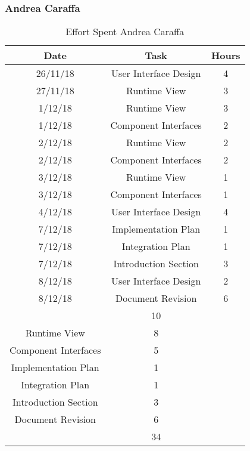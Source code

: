\clearpage
\newpage

\subsubsection{Andrea Caraffa}
\begin{table}[h]
\centering
\begin{tabular}{|c|c|c|}
\hline
\rowcolor[HTML]{FE996B} 
Date & Task & Hours 
\\ \hline
\rowcolor[HTML]{FFFC9E} 
26/11/18  & User Interface Design & 4
\\ \hline
\rowcolor[HTML]{FFFC9E} 
27/11/18 & Runtime View & 3 
\\ \hline
\rowcolor[HTML]{FFFC9E}
1/12/18 & Runtime View & 3
\\ \hline
\rowcolor[HTML]{FFFC9E}
1/12/18 & Component Interfaces & 2
\\ \hline
\rowcolor[HTML]{FFFC9E}
2/12/18 & Runtime View & 2
\\ \hline
\rowcolor[HTML]{FFFC9E}
2/12/18 & Component Interfaces & 2
\\ \hline
\rowcolor[HTML]{FFFC9E}
3/12/18 & Runtime View & 1
\\ \hline
\rowcolor[HTML]{FFFC9E}
3/12/18 & Component Interfaces & 1
\\ \hline
\rowcolor[HTML]{FFFC9E}
4/12/18 & User Interface Design & 4
\\ \hline
\rowcolor[HTML]{FFFC9E}
7/12/18 & Implementation Plan & 1
\\ \hline
\rowcolor[HTML]{FFFC9E}
7/12/18 & Integration Plan & 1
\\ \hline
\rowcolor[HTML]{FFFC9E}
7/12/18 & Introduction Section & 3
\\ \hline
\rowcolor[HTML]{FFFC9E}
8/12/18 & User Interface Design & 2
\\ \hline
\rowcolor[HTML]{FFFC9E}
8/12/18 & Document Revision & 6
\\ \hline


\rowcolor[HTML]{FFCE93} 
\multicolumn{2}{|c|}{User Interface Design} & 10 \\ 
\hline
\rowcolor[HTML]{FFCE93} 
\multicolumn{2}{|c|} {Runtime View} & 8 \\
\hline
\rowcolor[HTML]{FFCE93} 
\multicolumn{2}{|c|} {Component Interfaces} & 5 \\
\hline
\rowcolor[HTML]{FFCE93} 
\multicolumn{2}{|c|} {Implementation Plan} & 1 \\
\hline
\rowcolor[HTML]{FFCE93} 
\multicolumn{2}{|c|} {Integration Plan} & 1 \\
\hline
\rowcolor[HTML]{FFCE93} 
\multicolumn{2}{|c|} {Introduction Section} & 3 \\
\hline
\rowcolor[HTML]{FFCE93} 
\multicolumn{2}{|c|} {Document Revision} & 6  \\
\hline


\rowcolor[HTML]{FE996B} 
\multicolumn{2}{|c|}{\cellcolor[HTML]{FE996B}Total} & \cellcolor[HTML]{FFFC9E}34 \\ \hline
\end{tabular}
\caption{Effort Spent Andrea Caraffa}
\end{table}



